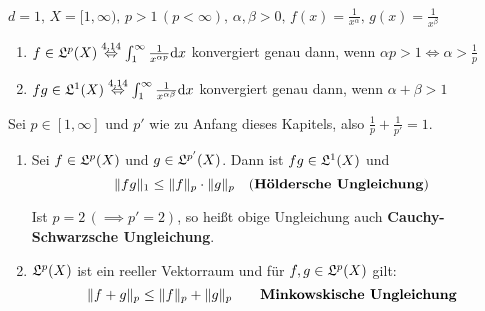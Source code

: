 \documentclass[a4paper,twoside,DIV15,BCOR12mm,chapterprefix=true,headings=onelinechapter]{scrbook}
\begin{document}
\begin{beispiele}
\(d=1,\,X=[1,\infty),\,p>1\,(p<\infty),\,\alpha,\beta>0,\,f(x)=\frac{1}{x^{\alpha}},\,g(x)=\frac{1}{x^{\beta}}\)
\begin{enumerate}
\item \(f\in\mathfrak{L}^{p}(X)\overset{\text{4.14}}{\Leftrightarrow}\int_{1}^{\infty}{\frac{1}{x^{\alpha p}}\mathrm{d}x}\) 
konvergiert genau dann, wenn \(\alpha p>1\Leftrightarrow \alpha>\frac{1}{p}\)
\item \(fg\in\mathfrak{L}^{1}(X)\overset{\text{4.14}}{\Leftrightarrow}\int_{1}^{\infty}{\frac{1}{x^{\alpha\beta}}\mathrm{d}x}\)
konvergiert genau dann, wenn \(\alpha+\beta>1\)
\end{enumerate}
\end{beispiele}

\begin{satz}
\label{Satz 16.1}
Sei \(p\in[1,\infty]\) und \(p'\) wie zu Anfang dieses Kapitels, also \(\frac{1}{p}+\frac{1}{p'}=1\).
\begin{enumerate}
\item Sei \(f\in\mathfrak{L}^{p}(X)\) und \(g\in\mathfrak{L}^{p'}(X)\).
Dann ist \(fg\in\mathfrak{L}^{1}(X)\) und 
\[
\lVert fg\rVert_{1}\leq\lVert f\rVert_{p}\cdot\lVert g\rVert_{p}\quad\text{(\textbf{H\"oldersche Ungleichung})}
\]

\label{Ungleichung!Cauchy-Schwarz}
Ist \(p=2\,(\implies p'=2)\), so hei\ss t obige Ungleichung auch \textbf{Cauchy-Schwarzsche Ungleichung}.
\item \(\mathfrak{L}^{p}(X)\) ist ein reeller Vektorraum und f\"ur \(f,g\in\mathfrak{L}^{p}(X)\) gilt:
\label{Ungleichung!Minkowski}
\[
\lVert f+g\rVert_{p}\leq\lVert f\rVert_{p}+\lVert g\rVert_{p}\qquad\text{\textbf{Minkowskische Ungleichung}}
\]
\end{enumerate}
\end{satz}
\end{document}
